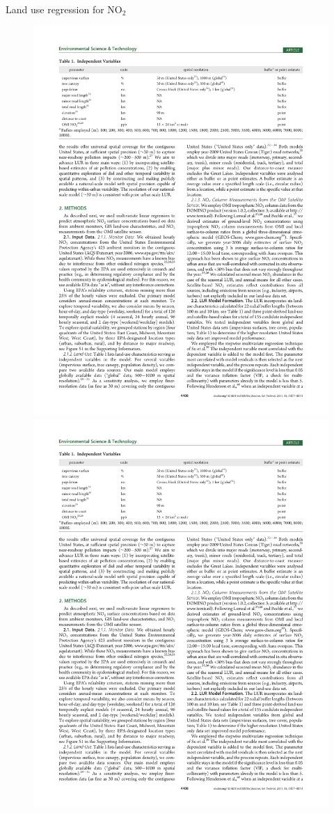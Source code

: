 \documentclass[aspectratio=169, handout]{beamer}
\begin{document}
\begin{frame}{Land use regression for NO$_2$}
\begin{figure}
\includegraphics[height=0.6\textheight]{novotny_tab1_2}
\includegraphics[height=0.6\textheight]{novotny_tab1_3}

\end{figure}
\end{frame}
\end{document}
